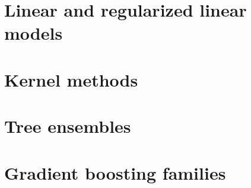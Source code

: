 \section{Linear and regularized linear models}\label{appendix:regressors_linear}

\section{Kernel methods}\label{appendix:regressors_kernel}

\section{Tree ensembles}\label{appendix:regressors_ensembles}

\section{Gradient boosting families}\label{appendix:regressors_boosting}


